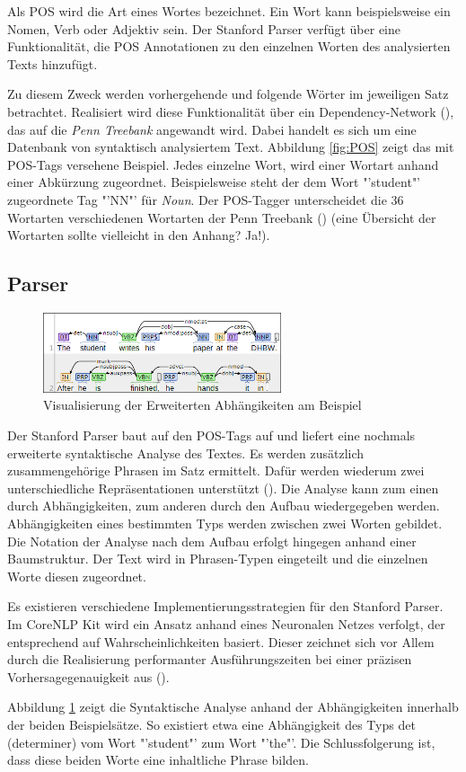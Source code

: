 Als \ac{POS} wird die Art eines Wortes bezeichnet. Ein Wort kann beispielsweise ein Nomen, Verb oder Adjektiv sein. Der Stanford Parser verfügt über eine Funktionalität, die \ac{POS} Annotationen zu den einzelnen Worten des analysierten Texts hinzufügt.\par
Zu diesem Zweck werden vorhergehende und folgende Wörter im jeweiligen Satz betrachtet. Realisiert wird diese Funktionalität über ein Dependency-Network (\cite[vgl.][1]{POSTAGGER}), das auf die \textit{Penn Treebank} angewandt wird. Dabei handelt es sich um eine Datenbank von syntaktisch analysiertem Text. Abbildung \ref{fig:POS} zeigt das mit POS-Tags versehene Beispiel. Jedes einzelne Wort, wird einer Wortart anhand einer Abkürzung zugeordnet. Beispielsweise steht der dem Wort "'student"' zugeordnete Tag "'NN"' für \textit{Noun}. Der POS-Tagger unterscheidet die 36 Wortarten verschiedenen Wortarten der Penn Treebank (\cite[vgl.][3]{PENNTREEBANK}) (eine Übersicht der Wortarten sollte vielleicht in den Anhang? Ja!).

\subsection{Parser}
\label{subsec:parser}
\begin{figure}
\includegraphics[width=7cm]{pictures/Parser.png}
\caption{Visualisierung der Erweiterten Abhängikeiten am Beispiel}
\label{fig:ENHDEPS}
\end{figure}
Der Stanford Parser baut auf den POS-Tags auf und liefert eine nochmals erweiterte syntaktische Analyse des Textes. Es werden zusätzlich zusammengehörige Phrasen im Satz ermittelt. Dafür werden wiederum zwei unterschiedliche Repräsentationen unterstützt (\cite[vgl.][4]{STANFORDNLP}). Die Analyse kann zum einen durch Abhängigkeiten, zum anderen durch den Aufbau wiedergegeben werden. Abhängigkeiten eines bestimmten Typs werden zwischen zwei Worten gebildet. Die Notation der Analyse nach dem Aufbau erfolgt hingegen anhand einer Baumstruktur. Der Text wird in Phrasen-Typen eingeteilt und die einzelnen Worte diesen zugeordnet.\par Es existieren verschiedene Implementierungsstrategien für den Stanford Parser. Im CoreNLP Kit wird ein Ansatz anhand eines Neuronalen Netzes verfolgt, der entsprechend auf Wahrscheinlichkeiten basiert. Dieser zeichnet sich vor Allem durch die Realisierung performanter Ausführungszeiten bei einer präzisen Vorhersagegenauigkeit aus (\cite[vgl.][8]{DEPPARSER}).\par
Abbildung \ref{fig:ENHDEPS} zeigt die Syntaktische Analyse anhand der Abhängigkeiten innerhalb der beiden Beispielsätze. So existiert etwa eine Abhängigkeit des Typs det (determiner) vom Wort "'student"' zum Wort "'the"'. Die Schlussfolgerung ist, dass diese beiden Worte eine inhaltliche Phrase bilden.

